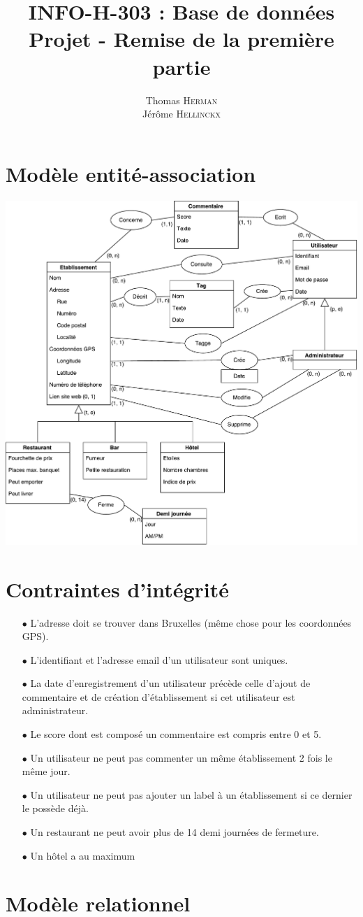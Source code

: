 \documentclass[a4paper, 11pt]{article}
\title{{INFO-H-303 : Base de données} \\ Projet - Remise de la première partie}
\author{Thomas \textsc{Herman} \\ Jérôme \textsc{Hellinckx}}
\begin{document}
\maketitle

\section{Modèle entité-association}
\begin{center}
	\includegraphics[scale=0.6]{horecaEA}
\end{center}

\section{Contraintes d'intégrité}

\begin{itemize}
	\item[$\bullet$] L'adresse doit se trouver dans Bruxelles (même chose pour les coordonnées GPS).
	\item[$\bullet$] L'identifiant et l'adresse email d'un utilisateur sont uniques.
	\item[$\bullet$] La date d'enregistrement d'un utilisateur précède celle d'ajout de commentaire et de création d'établissement si cet utilisateur est administrateur.
	\item[$\bullet$] Le score dont est composé un commentaire est compris entre 0 et 5.
	\item[$\bullet$] Un utilisateur ne peut pas commenter un même établissement 2 fois le même jour.
	\item[$\bullet$] Un utilisateur ne peut pas ajouter un label à un établissement si ce dernier le possède déjà.
	\item[$\bullet$] Un restaurant ne peut avoir plus de 14 demi journées de fermeture.
	\item[$\bullet$] Un hôtel a au maximum 
\end{itemize}

\section{Modèle relationnel}
\end{document}
